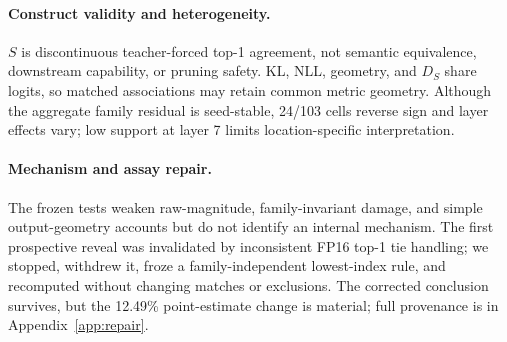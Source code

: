 \paragraph{Construct validity and heterogeneity.}
$S$ is discontinuous teacher-forced top-1 agreement, not semantic equivalence,
downstream capability, or pruning safety. KL, NLL, geometry, and $D_S$ share
logits, so matched associations may retain common metric geometry. Although the
aggregate family residual is seed-stable, 24/103 cells reverse sign and layer
effects vary; low support at layer 7 limits location-specific interpretation.

\paragraph{Mechanism and assay repair.}
The frozen tests weaken raw-magnitude, family-invariant damage, and simple
output-geometry accounts but do not identify an internal mechanism. The first
prospective reveal was invalidated by inconsistent FP16 top-1 tie handling; we
stopped, withdrew it, froze a family-independent lowest-index rule, and
recomputed without changing matches or exclusions. The corrected conclusion
survives, but the 12.49\% point-estimate change is material; full provenance is
in Appendix~\ref{app:repair}.
